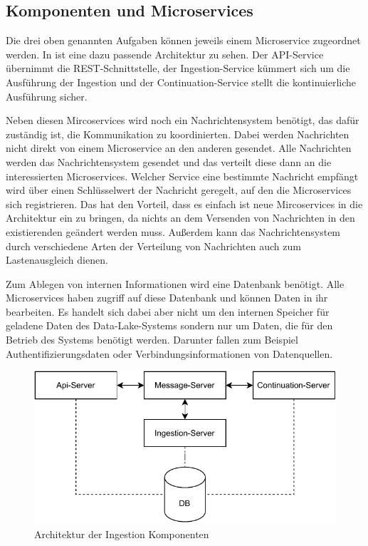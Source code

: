 \subsection{Komponenten und Microservices}
Die drei oben genannten Aufgaben können jeweils einem Microservice zugeordnet werden.
In  ist eine dazu passende Architektur zu sehen.
Der API-Service übernimmt die REST-Schnittstelle, der Ingestion-Service kümmert sich um die Ausführung der Ingestion und der Continuation-Service stellt die kontinuierliche Ausführung sicher.

Neben diesen Mircoservices wird noch ein Nachrichtensystem benötigt, das dafür zuständig ist, die Kommunikation zu koordinierten.
Dabei werden Nachrichten nicht direkt von einem Microservice an den anderen gesendet.
Alle Nachrichten werden das Nachrichtensystem gesendet und das verteilt diese dann an die interessierten Microservices.
Welcher Service eine bestimmte Nachricht empfängt wird über einen Schlüsselwert der Nachricht geregelt, auf den die Microservices sich registrieren.
Das hat den Vorteil, dass es einfach ist neue Mircoservices in die Architektur ein zu bringen, da nichts an dem Versenden von Nachrichten in den existierenden geändert werden muss.
Außerdem kann das Nachrichtensystem durch verschiedene Arten der Verteilung von Nachrichten auch zum Lastenausgleich dienen.

Zum Ablegen von internen Informationen wird eine Datenbank benötigt.
Alle Microservices haben zugriff auf diese Datenbank und können Daten in ihr bearbeiten.
Es handelt sich dabei aber nicht um den internen Speicher für geladene Daten des Data-Lake-Systems sondern nur um Daten, die für den Betrieb des Systems benötigt werden.
Darunter fallen zum Beispiel Authentifizierungsdaten oder Verbindungsinformationen von Datenquellen.

\begin{figure}
  \centering
  \includegraphics{Grafiken/ingestion-arch.pdf}
  \caption{Architektur der Ingestion Komponenten}
  \label{fig:ingestion_arch}
\end{figure}
